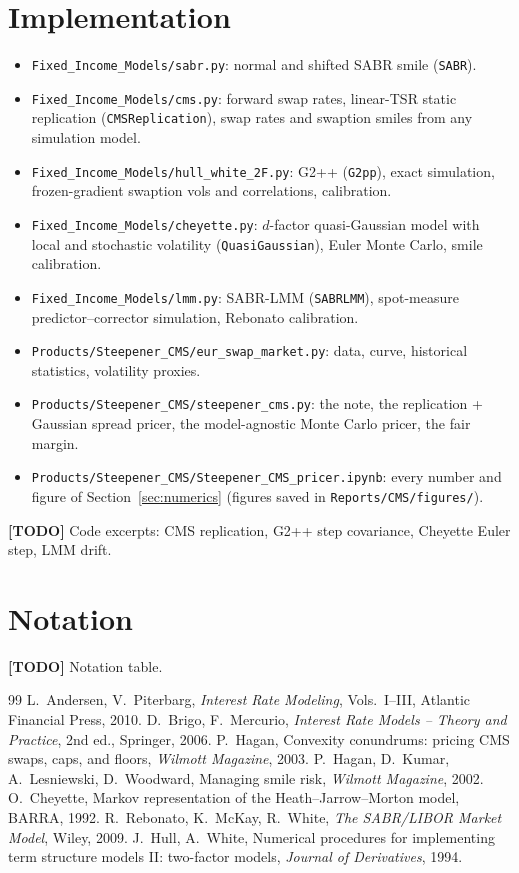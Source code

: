 \documentclass[11pt,a4paper]{article}
\theoremstyle{plain}
\theoremstyle{definition}
\newcommand{\todo}[1]{\textcolor{red!70!black}{\textbf{[TODO]} #1}}
\begin{document}
\section{Implementation}
\label{app:code}
\begin{itemize}
    \item \texttt{Fixed\_Income\_Models/sabr.py}: normal and shifted SABR smile (\texttt{SABR}).
    \item \texttt{Fixed\_Income\_Models/cms.py}: forward swap rates, linear-TSR static replication (\texttt{CMSReplication}), swap rates and swaption smiles from any simulation model.
    \item \texttt{Fixed\_Income\_Models/hull\_white\_2F.py}: G2++ (\texttt{G2pp}), exact simulation, frozen-gradient swaption vols and correlations, calibration.
    \item \texttt{Fixed\_Income\_Models/cheyette.py}: $d$-factor quasi-Gaussian model with local and stochastic volatility (\texttt{QuasiGaussian}), Euler Monte Carlo, smile calibration.
    \item \texttt{Fixed\_Income\_Models/lmm.py}: SABR-LMM (\texttt{SABRLMM}), spot-measure predictor--corrector simulation, Rebonato calibration.
    \item \texttt{Products/Steepener\_CMS/eur\_swap\_market.py}: data, curve, historical statistics, volatility proxies.
    \item \texttt{Products/Steepener\_CMS/steepener\_cms.py}: the note, the replication + Gaussian spread pricer, the model-agnostic Monte Carlo pricer, the fair margin.
    \item \texttt{Products/Steepener\_CMS/Steepener\_CMS\_pricer.ipynb}: every number and figure of Section~\ref{sec:numerics} (figures saved in \texttt{Reports/CMS/figures/}).
\end{itemize}
\todo{Code excerpts: CMS replication, G2++ step covariance, Cheyette Euler step, LMM drift.}

\section{Notation}
\label{app:notation}
\todo{Notation table.}

\begin{thebibliography}{99}
 L.~Andersen, V.~Piterbarg, \emph{Interest Rate Modeling}, Vols.~I--III, Atlantic Financial Press, 2010.
 D.~Brigo, F.~Mercurio, \emph{Interest Rate Models -- Theory and Practice}, 2nd ed., Springer, 2006.
 P.~Hagan, Convexity conundrums: pricing CMS swaps, caps, and floors, \emph{Wilmott Magazine}, 2003.
 P.~Hagan, D.~Kumar, A.~Lesniewski, D.~Woodward, Managing smile risk, \emph{Wilmott Magazine}, 2002.
 O.~Cheyette, Markov representation of the Heath--Jarrow--Morton model, BARRA, 1992.
 R.~Rebonato, K.~McKay, R.~White, \emph{The SABR/LIBOR Market Model}, Wiley, 2009.
 J.~Hull, A.~White, Numerical procedures for implementing term structure models II: two-factor models, \emph{Journal of Derivatives}, 1994.
\end{thebibliography}
\end{document}
